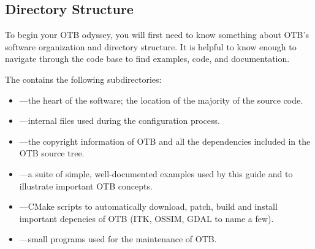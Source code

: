 \subsection{Directory Structure}
\label{sec:DirectoryStructure}

To begin your OTB odyssey, you will first need to know something about OTB's
software organization and directory structure. It is helpful to know enough to
navigate through the code base to find examples, code, and documentation.

The  contains the following subdirectories:
\begin{itemize}
        \item {}---the heart of the software; the location
        of the majority of the source code.
        \item {}---internal files used during the
        configuration process.
        \item {}---the copyright information of OTB
        and all the dependencies included in the OTB source tree.
        \item {}---a suite of simple, well-documented
        examples used by this guide and to illustrate important
        OTB concepts.
        \item {}---CMake scripts to automatically download, patch, build and install important
        depencies of OTB (ITK, OSSIM, GDAL to name a few).
        \item {}---small programs used for the maintenance of OTB.
\end{itemize}


